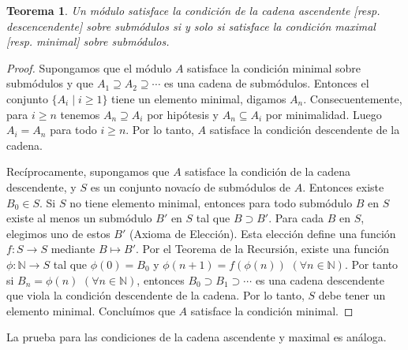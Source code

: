 \documentclass{report}
\newcommand{\naturalNumbers}{\mathbb{N}}
\newtheorem{theorem}{Teorema}
\begin{document}
  \begin{theorem}
    \label{theorem:equivalenceOfChainConditions}
    Un módulo satisface la condición de la cadena ascendente [resp. descencendente] sobre submódulos si y solo si satisface la condición maximal [resp. minimal] sobre submódulos.
  \end{theorem}
  \begin{proof}
    Supongamos que el módulo \(A\) satisface la condición minimal sobre submódulos y que \(A_1 \supseteq A_2 \supseteq \cdots\) es una cadena de submódulos.
    Entonces el conjunto \(\{A_i \mid i \geq 1\}\) tiene un elemento minimal, digamos \(A_n\).
    Consecuentemente, para \(i \geq n\) tenemos \(A_n \supseteq A_i\) por hipótesis y \(A_n \subseteq A_i\) por minimalidad. Luego \(A_i = A_n\) para todo \(i \geq n\).
    Por lo tanto, \(A\) satisface la condición descendente de la cadena.

    Recíprocamente, supongamos que \(A\) satisface la condición de la cadena descendente, y \(S\) es un conjunto novacío de submódulos de \(A\).
    Entonces existe \(B_0 \in S\).
    Si \(S\) no tiene elemento minimal, entonces para todo submódulo \(B\) en \(S\) existe al menos un submódulo \(B'\) en \(S\) tal que \(B \supset B'\).
    Para cada \(B\) en \(S\), elegimos uno de estos \(B'\) (Axioma de Elección).
    Esta elección define una función \(f : S \rightarrow S\) mediante \(B \mapsto B'\).
    Por el Teorema de la Recursión, existe una función \(\phi : \naturalNumbers \rightarrow S\) tal que \(\phi(0) = B_0\) y \(\phi(n + 1) = f(\phi(n))\) \((\forall n \in \naturalNumbers)\).
    Por tanto si \(B_n = \phi(n)\) \((\forall n \in \naturalNumbers)\), entonces \(B_0 \supset B_1 \supset \cdots\) es una cadena descendente que viola la condición descendente de la cadena.
    Por lo tanto, \(S\) debe tener un elemento minimal.
    Concluímos que \(A\) satisface la condición minimal.
  \end{proof}
  La prueba para las condiciones de la cadena ascendente y maximal es análoga.
\end{document}
